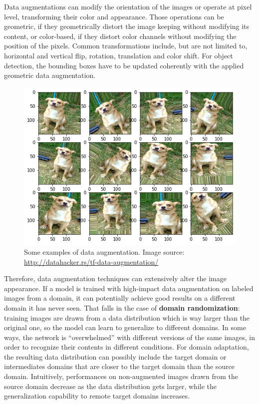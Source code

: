 \documentclass[%
    corpo=12pt,
    twoside,
    stile=classica,   
    tipotesi=magistrale,
    evenboxes,
    english,
	numerazioneromana,
]{toptesi}
\newcommand{\quotes}[1]{``#1''}
\begin{document}
Data augmentations can modify the orientation of the images or operate at pixel level, transforming their color and appearance. Those operations can be geometric, if they geometrically distort the image keeping without modifying its content, or color-based, if they distort color channels without modifying the position of the pixels. Common transformations include, but are not limited to, horizontal and vertical flip, rotation, translation and color shift. For object detection, the bounding boxes have to be updated coherently with the applied geometric data augmentation.

\begin{figure}[ht!]
	\centering
	\includegraphics[width=0.8\linewidth]{imgs/augmentation.png}
	\caption[Some examples of data augmentation]{Some examples of data augmentation. Image source: \url{http://datahacker.rs/tf-data-augmentation/}}
	\label{fig:augmentation}
\end{figure}

Therefore, data augmentation techniques can extensively alter the image appearance. If a model is trained with high-impact data augmentation on labeled images from a domain, it can potentially achieve good results on a different domain it has never seen. That falls in the case of \textbf{domain randomization}: training images are drawn from a data distribution which is way larger than the original one, so the model can learn to generalize to different domains. In some ways, the network is \quotes{overwhelmed} with different versions of the same images, in order to recognize their contents in different conditions. For domain adaptation, the resulting data distribution can possibly include the target domain or intermediates domains that are closer to the target domain than the source domain. Intuitively, performances on non-augmented images drawn from the source domain decrease as the data distribution gets larger, while the generalization capability to remote target domains increases.
\end{document}
